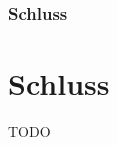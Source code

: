 
\begin{frame}

    \frametitle{Schluss}
    \section{Schluss}\label{sec:schluss}

    TODO


\end{frame}